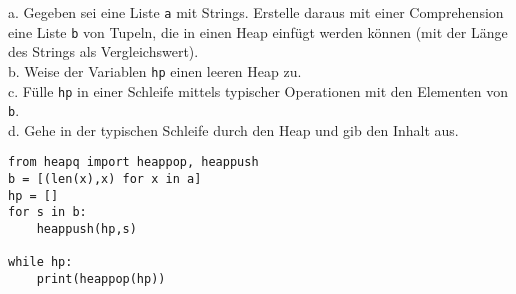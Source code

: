 \question[4]
a. Gegeben sei eine Liste \texttt{a} mit Strings.
Erstelle daraus mit einer Comprehension eine Liste \texttt{b} von Tupeln,
die in einen Heap einfügt werden können (mit der Länge des Strings als Vergleichswert).  \\
b. Weise der Variablen \texttt{hp} einen leeren Heap zu. \\
c. Fülle \texttt{hp} in einer Schleife mittels typischer Operationen mit den Elementen von
\texttt{b}. \\
d. Gehe in der typischen Schleife durch den Heap und gib den Inhalt aus.
\begin{solutionbox}{5cm}
\begin{lstlisting}
from heapq import heappop, heappush
b = [(len(x),x) for x in a]
hp = []
for s in b:
    heappush(hp,s)

while hp:
    print(heappop(hp))
\end{lstlisting}
\end{solutionbox}
